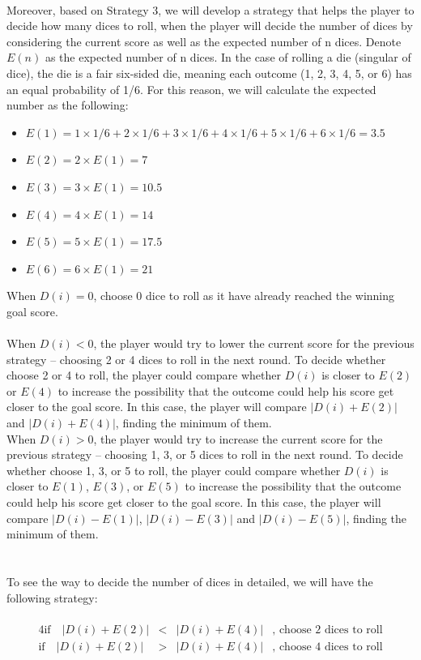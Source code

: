\documentclass[12pt]{article}
\begin{document}
\\
Moreover, based on Strategy 3, we will develop a strategy that helps the player to decide how many dices to roll, when the player will decide the number of dices by considering the current score as well as the expected number of n dices. Denote $E(n)$ as the expected number of n dices. In the case of rolling a die (singular of dice), the die is a fair six-sided die, meaning each outcome (1, 2, 3, 4, 5, or 6) has an equal probability of 1/6. For this reason, we will calculate the expected number as the following:
\begin{itemize}
    \item $E(1)= 1 \times 1/6 + 2 \times 1/6 + 3 \times 1/6 + 4 \times 1/6 + 5 \times 1/6 + 6 \times 1/6 = 3.5 $
    \item $E(2) = 2\times E(1) = 7$
    \item $E(3) = 3\times E(1) = 10.5$
    \item $E(4) = 4\times E(1) = 14$
    \item $E(5) = 5\times E(1) = 17.5$
    \item $E(6) = 6\times E(1) = 21$
\end{itemize}
When $D(i) = 0$, choose 0 dice to roll as it have already reached the winning goal score.\\\\
When $D(i) < 0$, the player would try to lower the current score for the previous strategy -- choosing 2 or 4 dices to roll in the next round. To decide whether choose 2 or 4 to roll, the player could compare whether $D(i)$ is closer to $E(2)$ or $E(4)$ to increase the possibility that the outcome could help his score get closer to the goal score. In this case, the player will compare $|D(i) + E(2)|$ and $|D(i) + E(4)|$, finding the minimum of them.\\
When $D(i) > 0$, the player would try to increase the current score for the previous strategy -- choosing 1, 3, or 5 dices to roll in the next round. To decide whether choose 1, 3, or 5 to roll, the player could compare whether $D(i)$ is closer to $E(1)$, $E(3)$, or $E(5)$ to increase the possibility that the outcome could help his score get closer to the goal score. In this case, the player will compare $|D(i) - E(1)|$, $|D(i) - E(3)|$  and $|D(i) - E(5)|$, finding the minimum of them. \\
\\\\
To see the way to decide the number of dices in detailed, we will have the following strategy:\\\\
\begin{alignat*}{4}
   \text{if} \quad |D(i) + E(2)| & {}<{} & |D(i) + E(4)| & \text{, choose 2 dices to roll} \\
   \text{if} \quad |D(i) + E(2)| & {}>{} & |D(i) + E(4)| & \text{, choose 4 dices to roll} \\
\end{alignat*}
\end{document}

